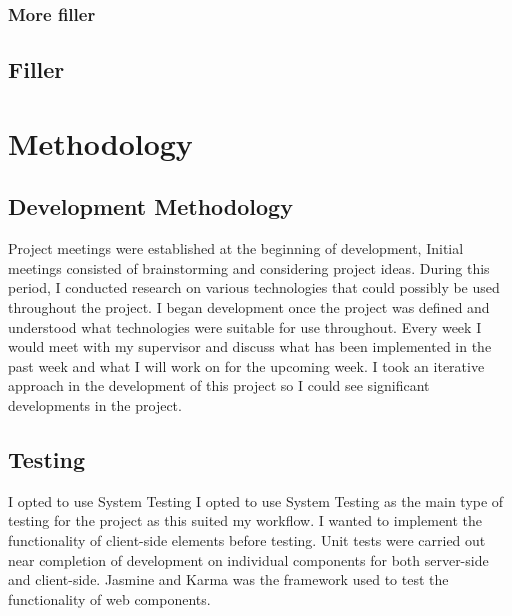 \subsection{More filler}

\section{Filler}


\chapter{Methodology}
\section{Development Methodology}
Project meetings were established at the beginning of development, Initial meetings consisted of brainstorming and considering project ideas. During this period, I conducted research on various technologies that could possibly be used throughout the project. I began development once the project was defined and understood what technologies were suitable for use throughout. Every week I would meet with my supervisor and discuss what has been implemented in the past week and what I will work on for the upcoming week. I took an iterative approach in the development of this project so I could see significant developments in the project.
\section{Testing}
I opted to use System Testing
I opted to use System Testing as the main type of testing for the project as this suited my workflow. I wanted to implement the functionality of client-side elements before testing. Unit tests were carried out near completion of development on individual components for both server-side and client-side. Jasmine and Karma was the framework used to test the functionality of web components.

